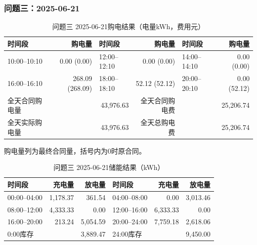\par\medskip
\par\noindent\begin{minipage}{\textwidth}
\subsubsection*{问题三：2025-06-21}
\begin{table}[H]\centering\small\setlength{\tabcolsep}{4pt}\caption{问题三 2025-06-21购电结果（电量kWh，费用元）}
\begin{tabular}{lr lr lr}\toprule
时间段 & 购电量 & 时间段 & 购电量 & 时间段 & 购电量\\\midrule
10:00--10:10 & 0.00 (0.00) & 12:00--12:10 & 0.00 (0.00) & 14:00--14:10 & 0.00 (0.00)\\
16:00--16:10 & 268.09 (268.09) & 18:00--18:10 & 52.12 (52.12) & 20:00--20:10 & 0.00 (52.12)\\
\midrule
全天合同购电量 & \multicolumn{2}{r}{43,976.63} & 全天合同购电费 & \multicolumn{2}{r}{25,206.74}\\
全天实际购电量 & \multicolumn{2}{r}{43,976.63} & 全天总购电费 & \multicolumn{2}{r}{25,206.74}\\
\bottomrule\end{tabular}\end{table}
\noindent\small 购电量列为最终合同量，括号内为0时原合同。\normalsize
\begin{table}[H]\centering\small\setlength{\tabcolsep}{4pt}\caption{问题三 2025-06-21储能结果（kWh）}
\begin{tabular}{lrr lrr}\toprule
时间段 & 充电量 & 放电量 & 时间段 & 充电量 & 放电量\\\midrule
00:00--04:00 & 1,178.37 & 361.54 & 04:00--08:00 & 0.00 & 3,013.46\\
08:00--12:00 & 4,333.33 & 0.00 & 12:00--16:00 & 6,333.33 & 0.00\\
16:00--20:00 & 213.24 & 5,054.59 & 20:00--24:00 & 7,759.18 & 2,618.06\\
\midrule
0:00库存 & \multicolumn{2}{r}{3,889.47} & 24:00库存 & \multicolumn{2}{r}{9,450.00}\\
\bottomrule\end{tabular}\end{table}
\end{minipage}\par

